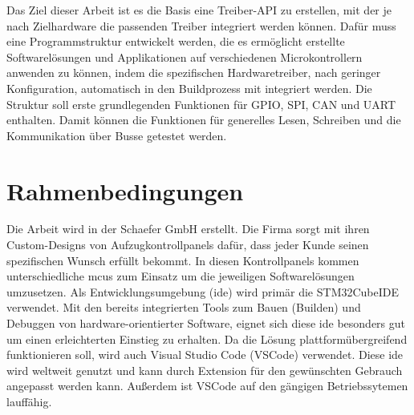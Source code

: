 Das Ziel dieser Arbeit ist es die Basis eine Treiber-API zu erstellen, mit der je nach Zielhardware die passenden Treiber integriert werden können.
Dafür muss eine Programmstruktur entwickelt werden, die es ermöglicht erstellte Softwarelösungen und Applikationen auf verschiedenen Microkontrollern anwenden zu können, indem die spezifischen Hardwaretreiber, nach geringer Konfiguration, automatisch in den Buildprozess mit integriert werden.
Die Struktur soll erste grundlegenden Funktionen für GPIO, SPI, CAN und UART enthalten. 
Damit können die Funktionen für generelles Lesen, Schreiben und die Kommunikation über Busse getestet werden.
\\
%
%
%




\section{Rahmenbedingungen} \label{chap2_rahmenbedingungen}
Die Arbeit wird in der Schaefer GmbH erstellt. 
Die Firma sorgt mit ihren Custom-Designs von Aufzugkontrollpanels dafür, dass jeder Kunde seinen spezifischen Wunsch erfüllt bekommt.
In diesen Kontrollpanels kommen unterschiedliche \gls{mcu}s zum Einsatz um die jeweiligen Softwarelösungen umzusetzen.
Als Entwicklungsumgebung (\gls{ide}) wird primär die STM32CubeIDE verwendet.
Mit den bereits integrierten Tools zum Bauen (Builden) und Debuggen von hardware-orientierter Software, eignet sich diese \gls{ide} besonders gut um einen erleichterten Einstieg zu erhalten.
Da die Lösung plattformübergreifend funktionieren soll, wird auch Visual Studio Code (VSCode) verwendet.
Diese \gls{ide} wird weltweit genutzt und kann durch Extension für den gewünschten Gebrauch angepasst werden kann. 
Außerdem ist VSCode auf den gängigen Betriebssytemen lauffähig.

